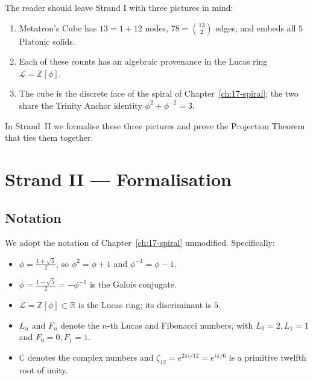 The reader should leave Strand I with three pictures in mind:

\begin{enumerate}
\item Metatron's Cube has $13 = 1 + 12$ nodes, $78 = \binom{13}{2}$
  edges, and embeds all $5$ Platonic solids.
\item Each of these counts has an algebraic provenance in the
  Lucas ring $\mathcal{L} = \mathbb{Z}[\phi]$.
\item The cube is the discrete face of the spiral of
  Chapter~\ref{ch:17-spiral}; the two share the Trinity Anchor
  identity $\phi^{2} + \phi^{-2} = 3$.
\end{enumerate}

In Strand~II we formalise these three pictures and prove the
Projection Theorem that ties them together.


\section{Strand II --- Formalisation}
\label{sec:13-strand-II}

\subsection{Notation}
\label{sec:13-notation}

We adopt the notation of Chapter~\ref{ch:17-spiral} unmodified.
Specifically:

\begin{itemize}
\item $\phi = \frac{1+\sqrt{5}}{2}$, so $\phi^{2} = \phi + 1$ and
  $\phi^{-1} = \phi - 1$.
\item $\bar\phi = \frac{1-\sqrt{5}}{2} = -\phi^{-1}$ is the Galois
  conjugate.
\item $\mathcal{L} = \mathbb{Z}[\phi] \subset \mathbb{R}$ is the
  Lucas ring; its discriminant is $5$.
\item $L_{n}$ and $F_{n}$ denote the $n$-th Lucas and Fibonacci
  numbers, with $L_{0} = 2, L_{1} = 1$ and $F_{0} = 0, F_{1} = 1$.
\item $\mathbb{C}$ denotes the complex numbers and $\zeta_{12} =
  e^{2\pi i / 12} = e^{i\pi/6}$ is a primitive twelfth root of
  unity.
\end{itemize}

